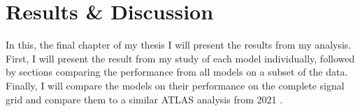 \chapter{Results \& Discussion}\label{subsec:ResDisc}
In this, the final chapter of my thesis I will present the results from my analysis. First,
I will present the result from my study of each model individually, followed by sections 
comparing the performance from all models on a subset of the data. Finally, I will compare 
the models on their performance on the complete signal grid and compare them to a similar \ac{ATLAS} 
analysis from 2021 \cite{atlas_search_2021}.

